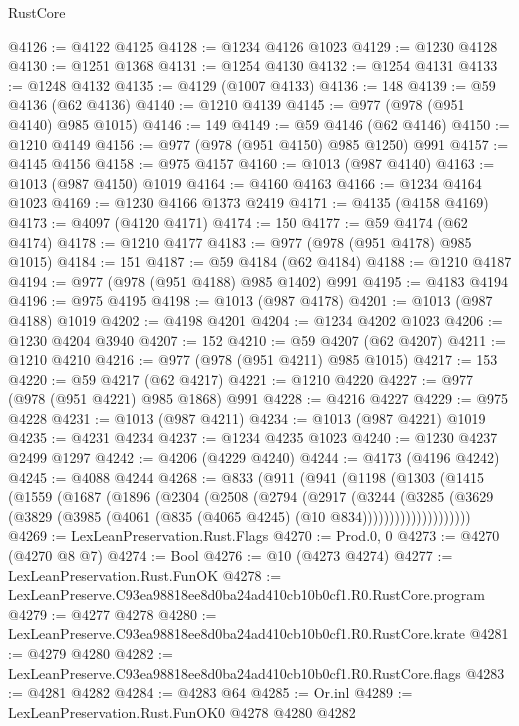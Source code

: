 \begin{lexlean}{RustCore}
\begin{coremodule}
@4126 := @4122 @4125
@4128 := @1234 @4126 @1023
@4129 := @1230 @4128
@4130 := @1251 @1368
@4131 := @1254 @4130
@4132 := @1254 @4131
@4133 := @1248 @4132
@4135 := @4129 (@1007 @4133)
@4136 := 148
@4139 := @59 @4136 (@62 @4136)
@4140 := @1210 @4139
@4145 := @977 (@978 (@951 @4140) @985 @1015)
@4146 := 149
@4149 := @59 @4146 (@62 @4146)
@4150 := @1210 @4149
@4156 := @977 (@978 (@951 @4150) @985 @1250) @991
@4157 := @4145 @4156
@4158 := @975 @4157
@4160 := @1013 (@987 @4140)
@4163 := @1013 (@987 @4150) @1019
@4164 := @4160 @4163
@4166 := @1234 @4164 @1023
@4169 := @1230 @4166 @1373 @2419
@4171 := @4135 (@4158 @4169)
@4173 := @4097 (@4120 @4171)
@4174 := 150
@4177 := @59 @4174 (@62 @4174)
@4178 := @1210 @4177
@4183 := @977 (@978 (@951 @4178) @985 @1015)
@4184 := 151
@4187 := @59 @4184 (@62 @4184)
@4188 := @1210 @4187
@4194 := @977 (@978 (@951 @4188) @985 @1402) @991
@4195 := @4183 @4194
@4196 := @975 @4195
@4198 := @1013 (@987 @4178)
@4201 := @1013 (@987 @4188) @1019
@4202 := @4198 @4201
@4204 := @1234 @4202 @1023
@4206 := @1230 @4204 @3940
@4207 := 152
@4210 := @59 @4207 (@62 @4207)
@4211 := @1210 @4210
@4216 := @977 (@978 (@951 @4211) @985 @1015)
@4217 := 153
@4220 := @59 @4217 (@62 @4217)
@4221 := @1210 @4220
@4227 := @977 (@978 (@951 @4221) @985 @1868) @991
@4228 := @4216 @4227
@4229 := @975 @4228
@4231 := @1013 (@987 @4211)
@4234 := @1013 (@987 @4221) @1019
@4235 := @4231 @4234
@4237 := @1234 @4235 @1023
@4240 := @1230 @4237 @2499 @1297
@4242 := @4206 (@4229 @4240)
@4244 := @4173 (@4196 @4242)
@4245 := @4088 @4244
@4268 := @833
    (@911
      (@941
        (@1198
          (@1303
            (@1415
              (@1559
                (@1687
                  (@1896
                    (@2304
                      (@2508
                        (@2794
                          (@2917
                            (@3244
                              (@3285
                                (@3629
                                  (@3829
                                    (@3985 (@4061 (@835 (@4065 @4245) (@10 @834))))))))))))))))))))
@4269 := LexLeanPreservation.Rust.Flags
@4270 := Prod.{0, 0}
@4273 := @4270 (@4270 @8 @7)
@4274 := Bool
@4276 := @10 (@4273 @4274)
@4277 := LexLeanPreservation.Rust.FunOK
@4278 := LexLeanPreserve.C93ea98818ee8d0ba24ad410cb10b0cf1.R0.RustCore.program
@4279 := @4277 @4278
@4280 := LexLeanPreserve.C93ea98818ee8d0ba24ad410cb10b0cf1.R0.RustCore.krate
@4281 := @4279 @4280
@4282 := LexLeanPreserve.C93ea98818ee8d0ba24ad410cb10b0cf1.R0.RustCore.flags
@4283 := @4281 @4282
@4284 := @4283 @64
@4285 := Or.inl
@4289 := LexLeanPreservation.Rust.FunOK0 @4278 @4280 @4282

\end{coremodule}
\end{lexlean}
